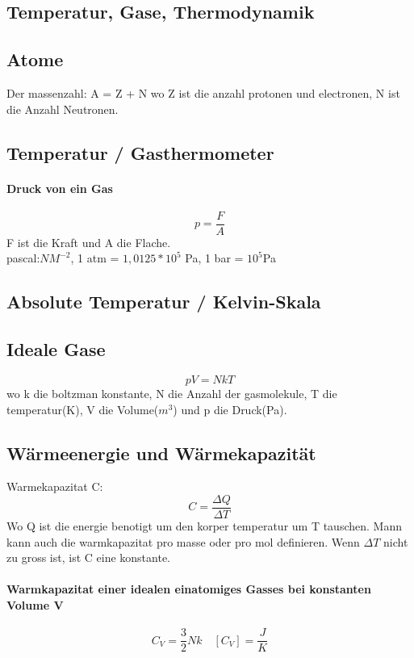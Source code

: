 \documentclass[7pt]{article}
\begin{document}
\begin{multicols*}{3}

\section{Temperatur, Gase,    Thermodynamik}
\subsection{Atome}
Der massenzahl: A = Z + N wo Z ist die anzahl protonen und electronen, N ist die Anzahl Neutronen.
\subsection{Temperatur / Gasthermometer}
\paragraph{Druck von ein Gas}
\begin{equation}
	p=\frac{F}{A}
\end{equation}
F ist die Kraft und A die Flache.\\
pascal:$NM^{-2}$, 1 atm = $1,0125 * 10^5$ Pa, 1 bar = $10^5$Pa
\subsection{Absolute Temperatur / Kelvin-Skala}

\subsection{Ideale Gase}
\begin{equation}
	pV=NkT
\end{equation}
wo k die boltzman konstante, N die Anzahl der gasmolekule, T die temperatur(K), V die Volume($m^3$) und p die Druck(Pa).
\subsection{W{\"a}rmeenergie und W{\"a}rmekapazit{\"a}t}
Warmekapazitat C:
\begin{equation}
	C=\frac{\Delta Q}{\Delta T}
\end{equation}
Wo Q ist die energie benotigt um den korper temperatur um T tauschen. Mann kann auch die warmkapazitat pro masse oder pro mol definieren. Wenn $\Delta T$ nicht zu gross ist, ist C eine konstante.
\paragraph{Warmkapazitat einer idealen einatomiges Gasses bei konstanten Volume V}
\begin{equation}
	C_V=\frac{3}{2}Nk\quad [C_V] = \frac{J}{K}
\end{equation}

\end{multicols*}
\end{document}
